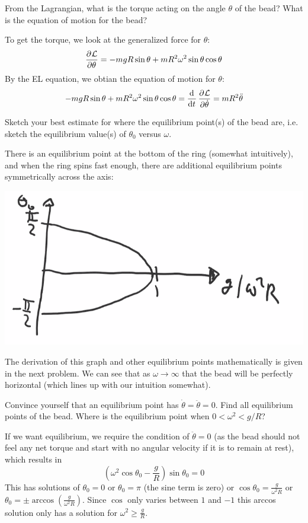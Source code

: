\begin{p}
From the Lagrangian, what is the torque acting on the angle $\theta$ of the bead? What is the equation of motion for the bead?
\end{p}
\begin{s}
To get the torque, we look at the generalized force for $\theta$:
\[\dpd{\LL}{\theta} = -mgR\sin\theta + mR^2\omega^2\sin\theta\cos\theta\]
By the EL equation, we obtian the equation of motion for $\theta$:
\[ -mgR\sin\theta + mR^2\omega^2\sin\theta\cos\theta = \dod{}{t}\dpd{\LL}{\dot{\theta}} = mR^2\ddot{\theta}\]
\end{s}

\begin{p}
Sketch your best estimate for where the equilibrium point(s) of the bead are, i.e. sketch the equilibrium value(s) of $\theta_0$ versus $\omega$.
\end{p}
\begin{s}
There is an equilibrium point at the bottom of the ring (somewhat intuitively), and when the ring spins fast enough, there are additional equilibrium points symmetrically across the axis:
\begin{center}
    \includegraphics[scale=0.4]{Lecture-5/W5-img2.png}
\end{center}
The derivation of this graph and other equilibrium points mathematically is given in the next problem. We can see that as $\omega \rightarrow \infty$ that the bead will be perfectly horizontal (which lines up with our intuition somewhat).
\end{s}

\begin{p}
Convince yourself that an equilibrium point has $\dot{\theta} = \ddot{\theta} = 0$. Find all equilibrium points of the bead. Where is the equilibrium point when $0 < \omega^2 < g/R$?
\end{p}
\begin{s}
If we want equilibrium, we require the condition of $\ddot{\theta} = 0$ (as the bead should not feel any net torque and start with no angular velocity if it is to remain at rest), which results in \[\left(\omega^2\cos\theta_0 - \frac{g}{R}\right)\sin\theta_0 = 0\]
This has solutions of $\theta_0 = 0$ or $\theta_0 = \pi$ (the sine term is zero) or $\cos\theta_0 = \frac{g}{\omega^2R}$ or $\theta_0 = \pm \arccos(\frac{g}{\omega^2R})$. Since $\cos$ only varies between $1$ and $-1$ this arccos solution only has a solution for $\omega^2 \geq \frac{g}{R}$.
\end{s}

